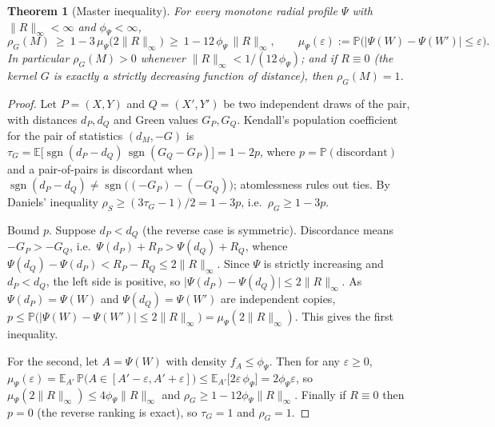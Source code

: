 \documentclass[11pt]{article}
\newtheorem{theorem}{Theorem}
\theoremstyle{remark}
\newcommand{\sgn}{\operatorname{sgn}}
\newcommand{\Rem}{R}
\newcommand{\dM}{d_M}
\newcommand{\rhoG}{\rho_G}
\begin{document}
\begin{theorem}[Master inequality]\label{thm:master}
For every monotone radial profile $\Psi$ with $\lVert\Rem\rVert_\infty<\infty$ and
$\phi_\Psi<\infty$,
\[
\rhoG(M)\ \ge\ 1-3\,\mu_\Psi\!\bigl(2\lVert\Rem\rVert_\infty\bigr)\ \ge\
1-12\,\phi_\Psi\,\lVert\Rem\rVert_\infty,
\qquad
\mu_\Psi(\varepsilon):=\mathbb P\bigl(\lvert\Psi(W)-\Psi(W')\rvert\le\varepsilon\bigr).
\]
In particular $\rhoG(M)>0$ whenever $\lVert\Rem\rVert_\infty<1/(12\,\phi_\Psi)$; and if
$\Rem\equiv0$ (the kernel $G$ is exactly a strictly decreasing function of distance),
then $\rhoG(M)=1$.
\end{theorem}

\begin{proof}
Let $P=(X,Y)$ and $Q=(X',Y')$ be two independent draws of the pair, with distances
$d_P,d_Q$ and Green values $G_P,G_Q$. Kendall's population coefficient for the pair of
statistics $(\dM,-G)$ is
$\tau_G=\mathbb E\bigl[\sgn(d_P-d_Q)\,\sgn(G_Q-G_P)\bigr]=1-2p$, where
$p=\mathbb P(\text{discordant})$ and a pair-of-pairs is discordant when
$\sgn(d_P-d_Q)\ne\sgn\bigl((-G_P)-(-G_Q)\bigr)$; atomlessness rules out ties. By Daniels'
inequality $\rho_S\ge(3\tau_G-1)/2=1-3p$, i.e.\ $\rhoG\ge1-3p$.

Bound $p$. Suppose $d_P<d_Q$ (the reverse case is symmetric). Discordance means
$-G_P>-G_Q$, i.e.\ $\Psi(d_P)+\Rem_P>\Psi(d_Q)+\Rem_Q$, whence
$\Psi(d_Q)-\Psi(d_P)<\Rem_P-\Rem_Q\le2\lVert\Rem\rVert_\infty$. Since $\Psi$ is strictly
increasing and $d_P<d_Q$, the left side is positive, so
$\lvert\Psi(d_P)-\Psi(d_Q)\rvert\le2\lVert\Rem\rVert_\infty$. As $\Psi(d_P)=\Psi(W)$ and
$\Psi(d_Q)=\Psi(W')$ are independent copies,
$p\le\mathbb P\bigl(\lvert\Psi(W)-\Psi(W')\rvert\le2\lVert\Rem\rVert_\infty\bigr)
=\mu_\Psi(2\lVert\Rem\rVert_\infty)$. This gives the first inequality.

For the second, let $A=\Psi(W)$ with density $f_A\le\phi_\Psi$. Then for any
$\varepsilon\ge0$,
$\mu_\Psi(\varepsilon)=\mathbb E_{A'}\,\mathbb P\bigl(A\in[A'-\varepsilon,A'+\varepsilon]\bigr)
\le\mathbb E_{A'}\bigl[2\varepsilon\,\phi_\Psi\bigr]=2\phi_\Psi\varepsilon$, so
$\mu_\Psi(2\lVert\Rem\rVert_\infty)\le4\phi_\Psi\lVert\Rem\rVert_\infty$ and
$\rhoG\ge1-12\phi_\Psi\lVert\Rem\rVert_\infty$. Finally if $\Rem\equiv0$ then $p=0$
(the reverse ranking is exact), so $\tau_G=1$ and $\rhoG=1$.
\end{proof}
\end{document}

